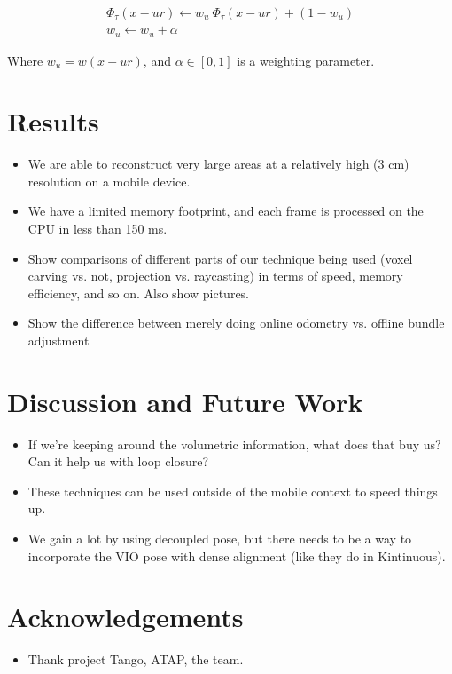 \documentclass[conference,10pt]{IEEEtran}
\begin{document}
\begin{align*}
\Phi_{\tau}(x - ur) \gets w_u\ \Phi_{\tau}(x - ur) + (1 - w_u) \\
%
w_u \gets w_u+ \alpha 
\end{align*}

\noindent Where  $w_u = w(x - ur)$, and $\alpha \in [0, 1]$ is a weighting
parameter.


\section{Results}
\begin{itemize}
    \item We are able to reconstruct very large areas at a relatively high (3
    cm) resolution on a mobile device.
    \item We have a limited memory footprint, and each frame is processed on
    the CPU in less than 150 ms.
    \item Show comparisons of different parts of our technique being used
    (voxel carving vs. not, projection vs. raycasting) in terms of speed, memory
    efficiency, and so on. Also show pictures.
    \item Show the difference between merely doing online odometry vs. offline
    bundle adjustment
\end{itemize}

\section{Discussion and Future Work}
\begin{itemize}
    \item If we're keeping around the volumetric information, what does that buy
    us? Can it help us with loop closure?
    \item These techniques can be used outside of the mobile context to speed
    things up.
    \item We gain a lot by using decoupled pose, but there needs to be a way to
    incorporate the VIO pose with dense alignment (like they do in Kintinuous).
\end{itemize}

\section{Acknowledgements}
\begin{itemize}
    \item Thank project Tango, ATAP, the team.
\end{itemize}


 
\end{document}
